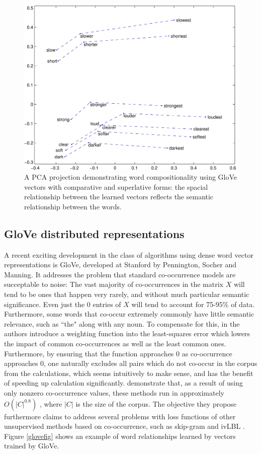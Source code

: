 \documentclass[conference]{IEEEtran}
\begin{document}
\begin{figure}
\label{glovefig}
	\centering
	\includegraphics[scale=3.5]{glove_demo.jpg}
	\caption{A PCA projection demonstrating word compositionality using GloVe vectors with comparative and superlative forms: the spacial relationship between the learned vectors reflects the semantic relationship between the words. \cite{GloVe}}
	\label{feat}
\end{figure}

\subsection{GloVe distributed representations}
A recent exciting development in the class of algorithms using dense word vector representations is GloVe, developed at Stanford by Pennington, Socher and Manning. It addresses the problem that standard co-occurrence models are succeptable to noise: The vast majority of co-occurrences in the matrix $X$ will tend to be ones that happen very rarely, and without much particular semantic significance. Even just the 0 entries of $X$ will tend to account for 75-95\% of data. Furthermore, some words that co-occur extremely commonly have little semantic relevance, such as ``the" along with any noun. To compensate for this, in \cite{GloVe} the authors introduce a weighting function into the least-squares error which lowers the impact of common co-occurrences as well as the least common ones. Furthermore, by ensuring that the function approaches 0 as co-occurrence approaches 0, one naturally excludes all pairs which do not co-occur in the corpus from the calculations, which seems intuitively to make sense, and has the benefit of speeding up calculation significantly. \cite{GloVe} demonstrate that, as a result of using only nonzero co-occurrence values, these methods run in approximately $O(|C|^{0.8})$ , where $|C|$ is the size of the corpus. The objective they propose furthermore claims to address several problems with loss functions of other unsupervised methods based on co-occurrence, such as skip-gram and ivLBL \cite{GloVe}. Figure \ref{glovefig} shows an example of word relationships learned by vectors trained by GloVe.\\
\end{document}
